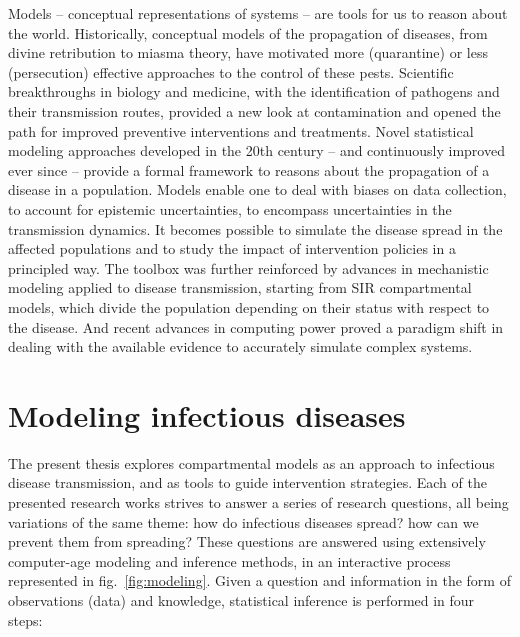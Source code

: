 Models -- conceptual representations of systems -- are tools for us to reason about the world. Historically, conceptual models of the propagation of diseases, from divine retribution to miasma theory, have motivated more (quarantine) or less (persecution) effective approaches to the control of these pests. Scientific breakthroughs in biology and medicine, with the identification of pathogens and their transmission routes, provided a new look at contamination and opened the path for improved preventive interventions and treatments. Novel statistical modeling approaches\cite{Freedman:AssociationCausationRemarks:1999} developed in the 20th century -- and continuously improved ever since\cite{Gelman:WhatAreMost:2021} --  provide a formal framework to reasons about the propagation of a disease in a population. Models enable one to deal with biases on data collection, to account for epistemic uncertainties, to encompass uncertainties in the transmission dynamics. It becomes possible to simulate the disease spread in the affected populations and to study the impact of intervention policies in a principled way. The toolbox was further reinforced by advances in mechanistic modeling applied to disease transmission, starting from SIR compartmental models\cite{Kermack:ContributionMathematicalTheory:1927, Anderson:PopulationBiologyInfectious:1979}, which divide the population depending on their status with respect to the disease. And recent advances in computing power proved a paradigm shift in dealing with the available evidence to accurately simulate complex systems.



\section{Modeling infectious diseases}
The present thesis explores compartmental models as an approach to infectious disease transmission, and as tools to guide intervention strategies. Each of the presented research works strives to answer a series of research questions, all being variations of the same theme: how do infectious diseases spread? how can we prevent them from spreading? These questions are answered using extensively computer-age modeling and inference methods, in an interactive process represented in fig.~\ref{fig:modeling}. Given a question and information in the form of observations (data) and knowledge, statistical inference is performed in four steps:

